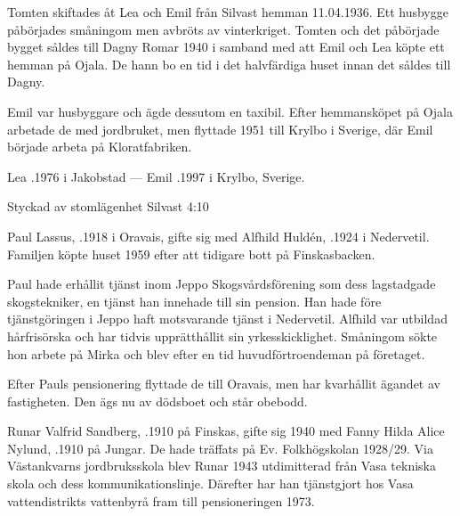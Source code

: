 Tomten skiftades åt Lea och Emil från Silvast hemman 11.04.1936. Ett husbygge påbörjades småningom men avbröts av vinterkriget. Tomten och det påbörjade bygget såldes till Dagny Romar 1940 i samband med att Emil och Lea köpte ett hemman på Ojala. De hann bo en tid i det halvfärdiga huset innan det såldes till Dagny.

Emil var husbyggare och ägde dessutom en taxibil. Efter hemmansköpet på Ojala arbetade de med jordbruket, men flyttade 1951 till Krylbo i Sverige, där Emil började arbeta på Kloratfabriken.

Lea .1976 i Jakobstad  ---  Emil .1997 i Krylbo, Sverige.



%

Styckad av stomlägenhet Silvast 4:10


%
Paul Lassus, .1918 i Oravais, gifte sig med Alfhild Huldén, .1924 i Nedervetil. Familjen köpte huset 1959 efter att tidigare bott på Finskasbacken.

Paul hade erhållit tjänst inom Jeppo Skogsvårdsförening som dess lagstadgade skogstekniker, en tjänst han innehade till sin pension. Han hade före tjänstgöringen i Jeppo haft motsvarande tjänst i Nedervetil. Alfhild var utbildad hårfrisörska och har tidvis upprätthållit sin yrkesskicklighet. Småningom sökte hon arbete på Mirka och blev efter en tid huvudförtroendeman på företaget.

Efter Pauls pensionering flyttade de till Oravais, men har kvarhållit ägandet av fastigheten. Den ägs nu av dödsboet och står obebodd.
\begin{jhchildren}
  \item {}
  \item {}
  \item {}
  \item {}
\end{jhchildren}


%
Runar Valfrid Sandberg, .1910 på Finskas, gifte sig 1940 med Fanny Hilda Alice Nylund, .1910 på Jungar. De hade träffats på Ev. Folkhögskolan 1928/29. Via Västankvarns jordbruksskola blev Runar 1943 utdimitterad från Vasa tekniska skola och dess kommunikationslinje. Därefter har han tjänstgjort hos Vasa vattendistrikts vattenbyrå fram till pensioneringen 1973.

